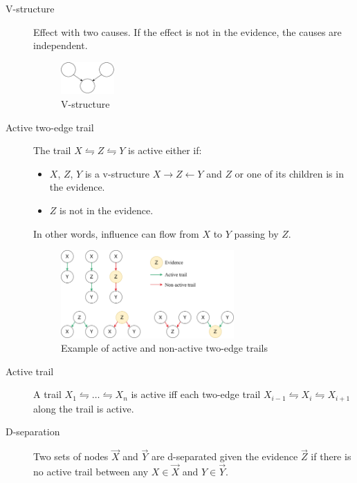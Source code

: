 \begin{description}
    \item[V-structure] 
        Effect with two causes.
        If the effect is not in the evidence, the causes are independent.

        \begin{figure}[H]
            \centering
            \includegraphics[width=0.2\textwidth]{img/_v_structure.pdf}
            \caption{V-structure}
        \end{figure}
    
    \item[Active two-edge trail] 
        The trail $X \leftrightharpoons Z \leftrightharpoons Y$ is active either if:
        \begin{itemize}
            \item $X$, $Z$, $Y$ is a v-structure $X \rightarrow Z \leftarrow Y$
                and $Z$ or one of its children is in the evidence.
            \item $Z$ is not in the evidence.
        \end{itemize}
        In other words, influence can flow from $X$ to $Y$ passing by $Z$.

        \begin{figure}[h]
            \centering
            \includegraphics[width=0.65\textwidth]{img/_active_trail.pdf}
            \caption{Example of active and non-active two-edge trails}
        \end{figure}
    
    \item[Active trail] 
        A trail $X_1 \leftrightharpoons \dots \leftrightharpoons X_n$ is active iff
        each two-edge trail $X_{i-1} \leftrightharpoons X_i \leftrightharpoons X_{i+1}$ along the trail is active.

    \item[D-separation] 
        Two sets of nodes $\vec{X}$ and $\vec{Y}$ are d-separated given the evidence $\vec{Z}$ if
        there is no active trail between any $X \in \vec{X}$ and $Y \in \vec{Y}$.


\end{description}
